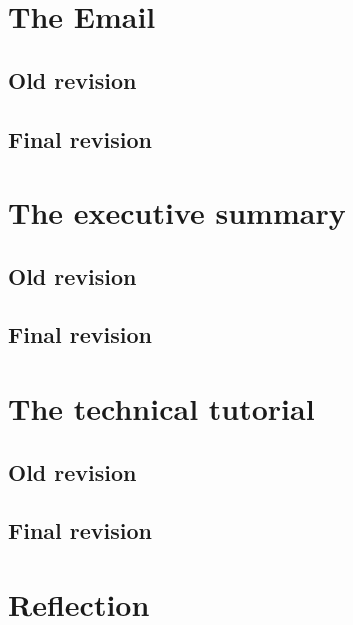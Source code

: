 \documentclass[11pt,english]{article}
\begin{document}
	\newpage
	\tableofcontents

	\newpage
	\section{The Email}
	\subsection{Old revision}
	

	\newpage
	\subsection{Final revision}
	

	\newpage
	\section{The executive summary}
	\subsection{Old revision}
	

	\newpage
	\subsection{Final revision}
	

	\newpage
	\section{The technical tutorial}
	\subsection{Old revision}
	

	\newpage
	\subsection{Final revision}

	\newpage
	\section{Reflection}
\end{document}
